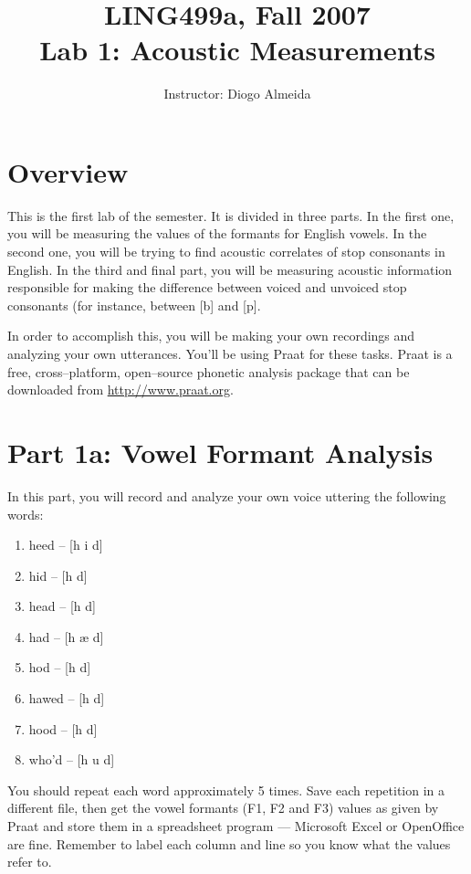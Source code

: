 \documentclass{article}
\title{LING499a, Fall 2007\\ Lab 1: Acoustic Measurements}
\author{Instructor: Diogo Almeida}
\newcommand{\soft}[1]{\textsf{#1}}
\newcommand{\MSExcel}{\soft{Microsoft\texttrademark{} Excel}}
\newcommand{\OpOff}{\soft{OpenOffice}}
\newcommand{\Praat}{\soft{Praat}}
\begin{document}
\maketitle

\tableofcontents
\newpage
\listoffigures
\newpage
\section{Overview}

This is the first lab of the semester. It is divided in three parts. In the first one, you will be measuring the values of the formants for English vowels. In the second one, you will be trying to find acoustic correlates of stop consonants in English. In the third and final part, you will be measuring acoustic information responsible for making the difference between voiced and unvoiced stop consonants (for instance, between [b] and [p].

In order to accomplish this, you will be making your own recordings and analyzing your own utterances. You'll be using \Praat{} for these tasks. \Praat{} is a free, cross--platform, open--source phonetic analysis package that can be downloaded from \href{http://www.praat.org}{http://www.praat.org}.

\section{Part 1a: Vowel Formant Analysis}

In this part, you will record and analyze your own voice uttering the following words:

\begin{enumerate}
\item heed -- [h i\textlengthmark{} d]
\item hid -- [h \textsci{} d]
\item head -- [h \textepsilon{} d] 
\item had -- [h \ae {} d]
\item hod -- [h \textscripta\textlengthmark{} d]
\item hawed -- [h \textopeno\textlengthmark{} d]
\item hood -- [h \textupsilon{} d]
\item who'd -- [h u\textlengthmark{} d]
\end{enumerate}

You should repeat each word approximately 5 times. Save each repetition in a different file, then get the vowel formants (F1, F2 and F3) values as given by \Praat{} and store them in a spreadsheet program --- \MSExcel{} or \OpOff{} are fine. Remember to label each column and line so you know what the values refer to.
\end{document}
